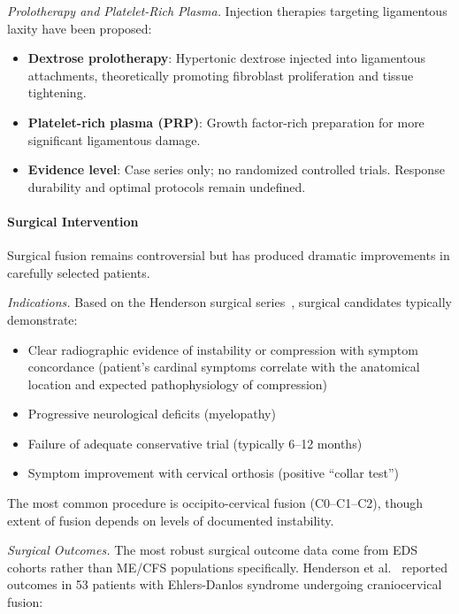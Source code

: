 \textit{Prolotherapy and Platelet-Rich Plasma.} Injection therapies targeting ligamentous laxity have been proposed:

\begin{itemize}
    \item \textbf{Dextrose prolotherapy}: Hypertonic dextrose injected into ligamentous attachments, theoretically promoting fibroblast proliferation and tissue tightening.
    \item \textbf{Platelet-rich plasma (PRP)}: Growth factor-rich preparation for more significant ligamentous damage.
    \item \textbf{Evidence level}: Case series only; no randomized controlled trials. Response durability and optimal protocols remain undefined.
\end{itemize}

\paragraph{Surgical Intervention}

Surgical fusion remains controversial but has produced dramatic improvements in carefully selected patients.

\textit{Indications.} Based on the Henderson surgical series~\cite{Henderson2024,Henderson2018}, surgical candidates typically demonstrate:

\begin{itemize}
    \item Clear radiographic evidence of instability or compression with symptom concordance (patient's cardinal symptoms correlate with the anatomical location and expected pathophysiology of compression)
    \item Progressive neurological deficits (myelopathy)
    \item Failure of adequate conservative trial (typically 6--12 months)
    \item Symptom improvement with cervical orthosis (positive ``collar test'')
\end{itemize}

The most common procedure is occipito-cervical fusion (C0--C1--C2), though extent of fusion depends on levels of documented instability.

\textit{Surgical Outcomes.} The most robust surgical outcome data come from EDS cohorts rather than ME/CFS populations specifically. Henderson et al.~\cite{Henderson2024} reported outcomes in 53 patients with Ehlers-Danlos syndrome undergoing craniocervical fusion:

